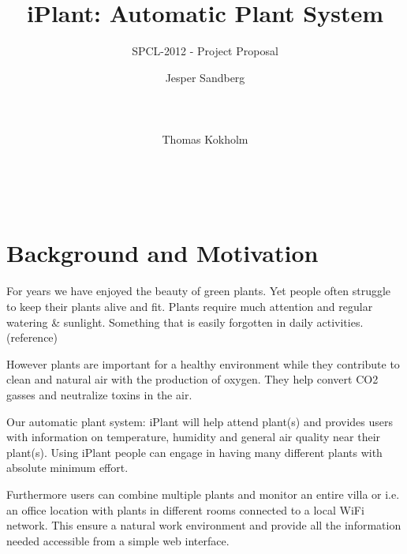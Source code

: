 \documentclass{ubicomp2012}
\begin{document}
\setlength{\paperheight}{11in}
\setlength{\paperwidth}{8.5in}
\setlength{\pdfpageheight}{\paperheight}
\setlength{\pdfpagewidth}{\paperwidth}




\title{iPlant: Automatic Plant System}
\subtitle{SPCL-2012 - Project Proposal}
\author{
  \alignauthor Jesper Sandberg\\
    \\
    \\
    \\
 \alignauthor Thomas Kokholm\\
    \\
    \\
    \\
      }
\maketitle

\section{Background and Motivation}
For years we have enjoyed the beauty of green plants. Yet people often struggle to keep their plants alive and fit. Plants require much attention and regular watering \& sunlight. Something that is easily forgotten in daily activities. (reference)

However plants are important for a healthy environment while they contribute to clean and natural air with the production of oxygen.
They help convert CO2 gasses and neutralize toxins in the air.

Our automatic plant system: iPlant will help attend plant(s) and provides users with information on temperature, humidity and general air quality near their plant(s). Using iPlant people can engage in having many different plants with absolute minimum effort.

Furthermore users can combine multiple plants and monitor an entire villa or i.e. an office location with plants in different rooms connected to a local WiFi network. This ensure a natural work environment and provide all the information needed accessible from a simple web interface.
\end{document}
